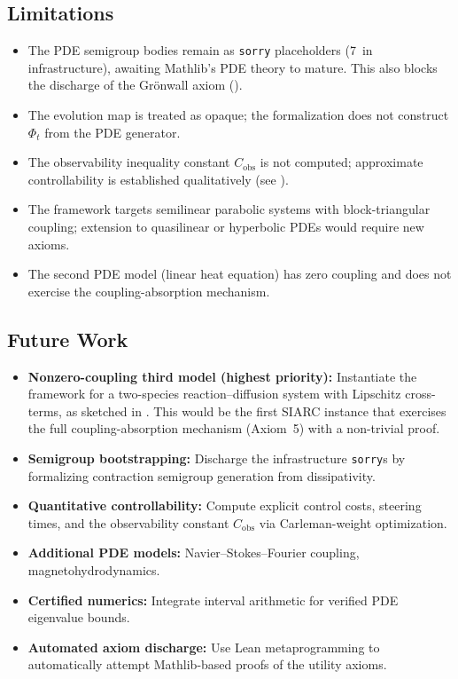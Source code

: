 \documentclass[11pt,a4paper]{article}
\theoremstyle{plain}
\theoremstyle{definition}
\theoremstyle{remark}
\newcommand{\sorry}{\texttt{sorry}}
\begin{document}
\subsection{Limitations}

\begin{itemize}
  \item The PDE semigroup bodies remain as \sorry{} placeholders
    (7~in infrastructure), awaiting Mathlib's PDE theory to mature.
    This also blocks the discharge of the Gr\"{o}nwall axiom
    ().
  \item The evolution map is treated as opaque; the formalization does
    not construct $\Phi_t$ from the PDE generator.
  \item The observability inequality constant $C_{\mathrm{obs}}$ is not
    computed; approximate controllability is established qualitatively
    (see ).
  \item The framework targets semilinear parabolic systems with
    block-triangular coupling;
    extension to quasilinear or hyperbolic PDEs would require new axioms.
  \item The second PDE model (linear heat equation) has zero coupling
    and does not exercise the coupling-absorption mechanism.
\end{itemize}

\subsection{Future Work}

\begin{itemize}
  \item \textbf{Nonzero-coupling third model (highest priority):}
    Instantiate the framework for a two-species reaction--diffusion
    system with Lipschitz cross-terms, as sketched in .
    This would be the first SIARC instance that exercises the full
    coupling-absorption mechanism (Axiom~5) with a non-trivial proof.
  \item \textbf{Semigroup bootstrapping:} Discharge the infrastructure
    \sorry{}s by formalizing contraction semigroup generation from
    dissipativity.
  \item \textbf{Quantitative controllability:} Compute explicit control
    costs, steering times, and the observability constant
    $C_{\mathrm{obs}}$ via Carleman-weight optimization.
  \item \textbf{Additional PDE models:} Navier--Stokes--Fourier
    coupling, magnetohydrodynamics.
  \item \textbf{Certified numerics:} Integrate interval arithmetic for
    verified PDE eigenvalue bounds.
  \item \textbf{Automated axiom discharge:} Use Lean metaprogramming to
    automatically attempt Mathlib-based proofs of the utility axioms.
\end{itemize}
\end{document}
